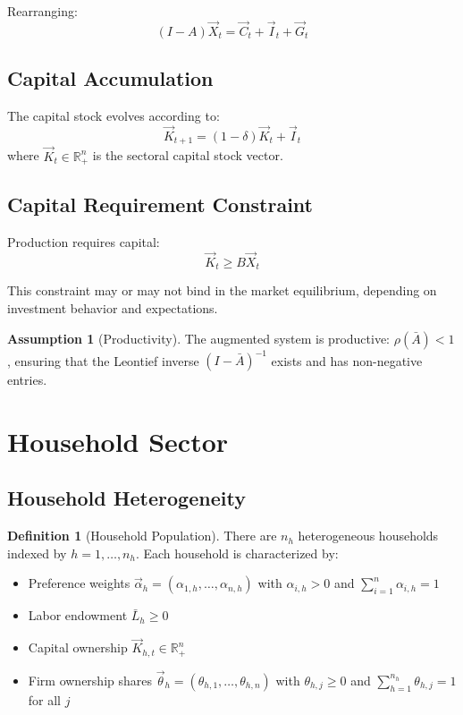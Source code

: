 \documentclass[12pt,a4paper]{article}
\theoremstyle{definition}
\newtheorem{definition}[theorem]{Definition}
\newtheorem{assumption}[theorem]{Assumption}
\theoremstyle{remark}
\newcommand{\R}{\mathbb{R}}
\begin{document}
Rearranging:
\begin{equation}
    (I - A)\vec{X}_t = \vec{C}_t + \vec{I}_t + \vec{G}_t
\end{equation}

\subsection{Capital Accumulation}

The capital stock evolves according to:
\begin{equation}
    \vec{K}_{t+1} = (1-\delta)\vec{K}_t + \vec{I}_t
\end{equation}
where $\vec{K}_t \in \R^n_+$ is the sectoral capital stock vector.

\subsection{Capital Requirement Constraint}

Production requires capital:
\begin{equation}
    \vec{K}_t \geq B\vec{X}_t
\end{equation}

This constraint may or may not bind in the market equilibrium, depending on investment behavior and expectations.

\begin{assumption}[Productivity]
The augmented system is productive: $\rho(\bar{A}) < 1$, ensuring that the Leontief inverse $(I - \bar{A})^{-1}$ exists and has non-negative entries.
\end{assumption}

\section{Household Sector}

\subsection{Household Heterogeneity}

\begin{definition}[Household Population]
There are $n_h$ heterogeneous households indexed by $h = 1,\ldots,n_h$. Each household is characterized by:
\begin{itemize}
    \item Preference weights $\vec{\alpha}_h = (\alpha_{1,h}, \ldots, \alpha_{n,h})$ with $\alpha_{i,h} > 0$ and $\sum_{i=1}^n \alpha_{i,h} = 1$
    \item Labor endowment $\bar{L}_h \geq 0$
    \item Capital ownership $\vec{K}_{h,t} \in \R^n_+$
    \item Firm ownership shares $\vec{\theta}_h = (\theta_{h,1}, \ldots, \theta_{h,n})$ with $\theta_{h,j} \geq 0$ and $\sum_{h=1}^{n_h} \theta_{h,j} = 1$ for all $j$
\end{itemize}
\end{definition}
\end{document}

